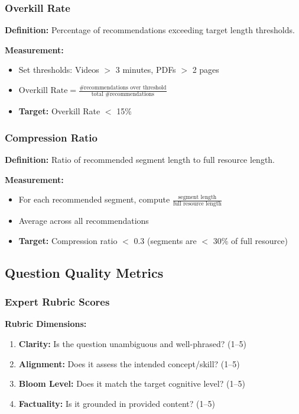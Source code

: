 \documentclass[11pt,letterpaper]{article}
\begin{document}
\subsubsection{Overkill Rate}\label{subsubsec:overkill-rate}

\textbf{Definition:} Percentage of recommendations exceeding target length thresholds.

\textbf{Measurement:}
\begin{itemize}
\item Set thresholds: Videos $>$ 3 minutes, PDFs $>$ 2 pages
\item $\text{Overkill Rate} = \frac{\text{\# recommendations over threshold}}{\text{total \# recommendations}}$
\item \textbf{Target:} Overkill Rate $<$ 15\%
\end{itemize}

\subsubsection{Compression Ratio}\label{subsubsec:compression-ratio}

\textbf{Definition:} Ratio of recommended segment length to full resource length.

\textbf{Measurement:}
\begin{itemize}
\item For each recommended segment, compute $\frac{\text{segment length}}{\text{full resource length}}$
\item Average across all recommendations
\item \textbf{Target:} Compression ratio $<$ 0.3 (segments are $<$ 30\% of full resource)
\end{itemize}

\subsection{Question Quality Metrics}\label{subsec:question-quality-metrics}

\subsubsection{Expert Rubric Scores}\label{subsubsec:expert-rubric-scores}

\textbf{Rubric Dimensions:}
\begin{enumerate}
\item \textbf{Clarity:} Is the question unambiguous and well-phrased? (1--5)
\item \textbf{Alignment:} Does it assess the intended concept/skill? (1--5)
\item \textbf{Bloom Level:} Does it match the target cognitive level? (1--5)
\item \textbf{Factuality:} Is it grounded in provided content? (1--5)
\end{enumerate}
\end{document}
